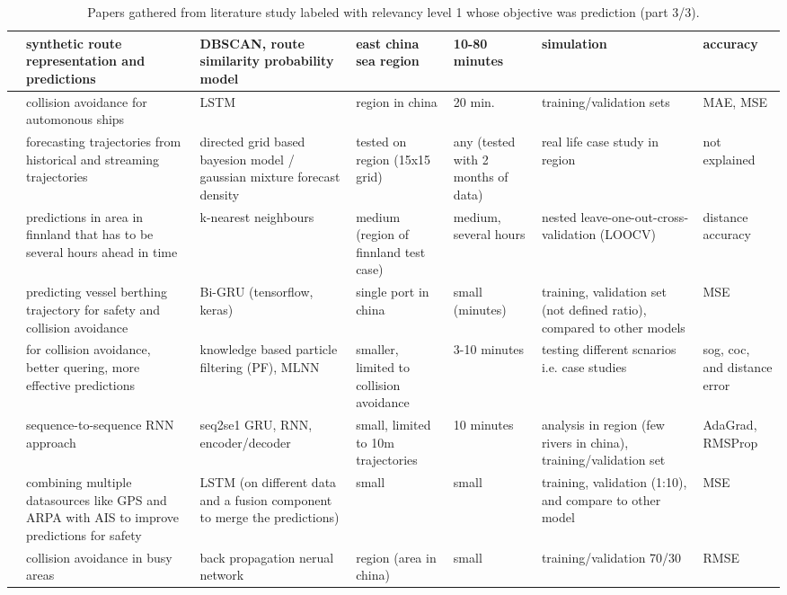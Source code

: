 \noindent
\begin{table}[htbp]
{\small\begin{tabularx}{1.2\textwidth}{p{0.6in} X X X p{0.4in} X p{0.5in}}
    \midrule
    \cite{Tafa2019AutomaticPrediction} & synthetic route representation and predictions & DBSCAN, route similarity probability model & east china sea region & 10-80 minutes & simulation & accuracy \\ \midrule
    \cite{Tang2019ANetwork} & collision avoidance for automonous ships & LSTM & region in china & 20 min. & training/validation sets & MAE, MSE \\ \midrule
    \cite{Uney2019DataModels} & forecasting trajectories from historical and streaming trajectories & directed grid based bayesion model / gaussian mixture forecast density & tested on region (15x15 grid) & any (tested with 2 months of data) & real life case study in region & not explained \\ \midrule
    \cite{Virjonen2018ShipMethod} & predictions in area in finnland that has to be several hours ahead in time & k-nearest neighbours & medium (region of finnland test case) & medium, several hours & nested leave-one-out-cross-validation (LOOCV) & distance accuracy \\ \midrule
    \cite{Wang2020VesselGRU} & predicting vessel berthing trajectory for safety and collision avoidance & Bi-GRU (tensorflow, keras) & single port in china & small (minutes) & training, validation set (not defined ratio), compared to other models & MSE \\ \midrule
    \cite{Xiao2020BigTechniques} & for collision avoidance, better quering, more effective predictions & knowledge based particle filtering (PF), MLNN & smaller, limited to collision avoidance & 3-10 minutes & testing different scnarios i.e. case studies & sog, coc, and distance error \\ \midrule
    \cite{You2020ST-Seq2Seq:Prediction} & sequence-to-sequence RNN approach & seq2se1 GRU, RNN, encoder/decoder & small, limited to 10m trajectories & 10 minutes & analysis in region (few rivers in china), training/validation set & AdaGrad, RMSProp \\ \midrule
    \cite{Zheng2020HeterogenousModeling} & combining multiple datasources like GPS and ARPA with AIS to improve predictions for safety & LSTM (on different data and a fusion component to merge the predictions) & small & small & training, validation (1:10), and compare to other model & MSE \\ \midrule
    \cite{Zhou2019ShipNetwork} & collision avoidance in busy areas & back propagation nerual network & region (area in china) & small & training/validation 70/30 & RMSE \\
    \bottomrule
\end{tabularx}}
\caption{Papers gathered from literature study labeled with relevancy level 1 whose objective was prediction (part 3/3).}
\label{tab:less_relevant_papers}
\label{tab:lit_review_cat_1_3}
\end{table}

